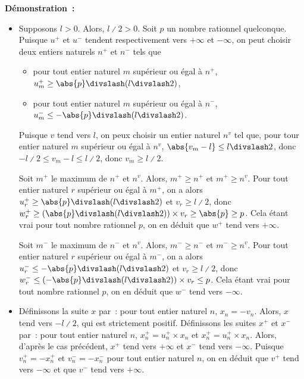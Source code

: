 \noindent\textbf{Démonstration :} 
\begin{itemize}[nosep]
    \item Supposons $l > 0$.
        Alors, $l \divslash 2 > 0$.
        Soit $p$ un nombre rationnel quelconque. 
        Puisque $u^+$ et $u^-$ tendent respectivement vers $+\infty$ et $-\infty$, on peut choisir deux entiers naturels $n^+$ et $n^-$ tels que
        \begin{itemize}[nosep]
            \item pour tout entier naturel $m$ supérieur ou égal à $n^+$, $u^+_m \geq \abs{p} \divslash (l \divslash 2)$,
            \item pour tout entier naturel $m$ supérieur ou égal à $n^-$, $u^-_m \leq -\abs{p} \divslash (l \divslash 2)$.
        \end{itemize}
        Puisque $v$ tend vers $l$, on peux choisir un entier naturel $n^v$ tel que, pour tour entier naturel $m$ supérieur ou égal à $n^v$, $\abs{v_m - l} \leq l \divslash 2$, donc $-l \divslash 2 \leq v_m - l \leq l \divslash 2$, donc $v_m \geq l \divslash 2$.
        
        Soit $m^+$ le maximum de $n^+$ et $n^v$. 
        Alors, $m^+ \geq n^+$ et $m^+ \geq n^v$.
        Pour tout entier naturel $r$ supérieur ou égal à $m^+$, on a alors $u^+_r \geq \abs{p} \divslash (l \divslash 2)$ et $v_r \geq l \divslash 2$, donc $w^+_r \geq \left( \abs{p} \divslash (l \divslash 2)\right) \times v_r \geq \abs{p} \geq p$. 
        Cela étant vrai pour tout nombre rationnel $p$, on en déduit que $w^+$ tend vers $+\infty$.

        Soit $m^-$ le maximum de $n^-$ et $n^v$. 
        Alors, $m^- \geq n^-$ et $m^- \geq n^v$.
        Pour tout entier naturel $r$ supérieur ou égal à $m^-$, on a alors $u^-_r \leq -\abs{p} \divslash (l \divslash 2)$ et $v_r \geq l \divslash 2$, donc $w^-_r \leq \left( - \abs{p} \divslash (l \divslash 2)\right) \times v_r \leq p$. 
        Cela étant vrai pour tout nombre rationnel $p$, on en déduit que $w^-$ tend vers $-\infty$.

    \item Définissons la suite $x$ par : pour tout entier naturel $n$, $x_n = -v_n$.
        Alors, $x$ tend vers $- l \divslash 2$, qui est strictement positif.
        Définissons les suites $x^+$ et $x^-$ par : pour tout entier naturel $n$, $x^+_n = u^+_n \times x_n$ et $x^+_n = u^+_n \times x_n$.
        Alors, d'après le cas précédent, $x^+$ tend vers $+\infty$ et $x^-$ tend vers $-\infty$.
        Puisque $v^+_n = - x^+_n$ et $v^-_n = - x^-_ n$ pour tout entier naturel $n$, on en déduit que $v^+$ tend vers $-\infty$ et que $v^-$ tend vers $+\infty$.
\end{itemize}

